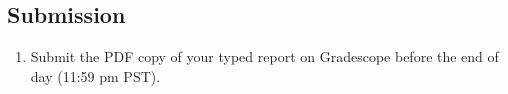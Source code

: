 \documentclass{article}
\begin{document}
\begin{enumerate}
\begin{answer}
\end{answer}

\end{enumerate}

\subsection*{Submission}
\begin{enumerate}
    \item Submit the PDF copy of your typed report on Gradescope before the end of day (11:59 pm PST).
\end{enumerate}


\end{document}
